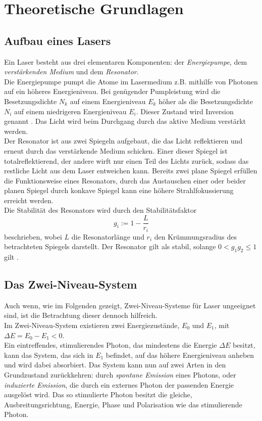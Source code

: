 \section{Theoretische Grundlagen}
\label{sec:theorie}

\subsection{Aufbau eines Lasers}

Ein Laser besteht aus drei elementaren Komponenten: der \textit{Energiepumpe}, dem \textit{verstärkenden Medium} und dem \textit{Resonator}. \\
Die Energiepumpe pumpt die Atome im Lasermedium z.B. mithilfe von Photonen auf ein höheres Energieniveau. 
Bei genügender Pumpleistung wird die Besetzungsdichte $N_k$ auf einem Energieniveau $E_k$ höher als die Besetzungsdichte $N_i$ auf einem niedrigeren Energieniveau $E_i$.
Dieser Zustand wird Inversion genannt \cite{dem01}.
Das Licht wird beim Durchgang durch das aktive Medium verstärkt werden. \\

Der Resonator ist aus zwei Spiegeln aufgebaut, die das Licht reflektieren und erneut durch das verstärkende Medium schicken.
Einer dieser Spiegel ist totalreflektierend, der andere wirft nur einen Teil des Lichts zurück, sodass das restliche Licht aus dem Laser entweichen kann.
Bereits zwei plane Spiegel erfüllen die Funktionsweise eines Resonators, durch das Austauschen einer oder beider planen Spiegel durch konkave Spiegel kann eine höhere Strahlfokussierung erreicht werden. \\

Die Stabilität des Resonators wird durch den Stabilitätsfaktor
\begin{equation}
    g_i := 1 - \frac{L}{r_i} 
\end{equation}
beschrieben, wobei $L$ die Resonatorlänge und $r_i$ den Krümmungsradius des betrachteten Spiegels darstellt.
Der Resonator gilt als stabil, solange $0 < g_1 g_2 \leq 1$ gilt \cite{dem01}.

\subsection{Das Zwei-Niveau-System}
\label{subsec:2nivsys}

Auch wenn, wie im Folgenden gezeigt, Zwei-Niveau-Systeme für Laser ungeeignet sind, ist die Betrachtung dieser dennoch hilfreich. \\
Im Zwei-Niveau-System existieren zwei Energiezustände, $E_0$ und $E_1$, mit $\Delta E = E_0 - E_1 < 0$. \\
Ein eintreffendes, stimulierendes Photon, das mindestens die Energie $\Delta E$ besitzt, kann das System, das sich in $E_1$ befindet, auf das höhere Energieniveau anheben und wird dabei absorbiert.
Das System kann nun auf zwei Arten in den Grundzustand zurückkehren: durch \textit{spontane Emission} eines Photons, oder \textit{induzierte Emission}, die durch ein externes Photon der passenden Energie ausgelöst wird.
Das so stimulierte Photon besitzt die gleiche, Ausbreitungsrichtung, Energie, Phase und Polarisation wie das stimulierende Photon. \\

